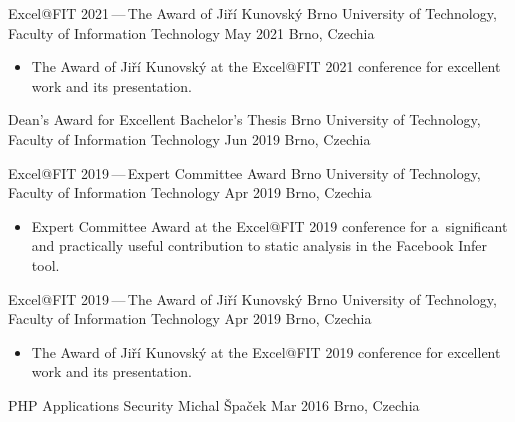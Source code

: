 \documentclass[10pt, a4paper, academicons]{altacv}
\begin{document}
\cvevent
{Excel@FIT 2021\,---\,The Award of Ji\v{r}\'{i} Kunovsk\'{y}}
{Brno University of Technology, Faculty of Information Technology}
{May 2021}
{Brno, Czechia}
\begin{itemize}\setlength{\itemindent}{.5em}\small
    \item[--] The Award of Ji\v{r}\'{i} Kunovsk\'{y} at the Excel@FIT 2021 conference for excellent work and its presentation.
\end{itemize}
\medskip

\cvevent
{Dean's Award for Excellent Bachelor's Thesis}
{Brno University of Technology, Faculty of Information Technology}
{Jun 2019}
{Brno, Czechia}

\cvevent
{Excel@FIT 2019\,---\,Expert Committee Award}
{Brno University of Technology, Faculty of Information Technology}
{Apr 2019}
{Brno, Czechia}
\begin{itemize}\setlength{\itemindent}{.5em}\small
    \item[--] Expert Committee Award at the Excel@FIT 2019 conference for a~significant and practically useful contribution to static analysis in the Facebook Infer tool.
\end{itemize}
\medskip

\cvevent
{Excel@FIT 2019\,---\,The Award of Ji\v{r}\'{i} Kunovsk\'{y}}
{Brno University of Technology, Faculty of Information Technology}
{Apr 2019}
{Brno, Czechia}
\begin{itemize}\setlength{\itemindent}{.5em}\small
    \item[--] The Award of Ji\v{r}\'{i} Kunovsk\'{y} at the Excel@FIT 2019 conference for excellent work and its presentation.
\end{itemize}
\medskip

\cvevent
{PHP Applications Security}
{Michal \v{S}pa\v{c}ek}
{Mar 2016}
{Brno, Czechia}
\end{document}
